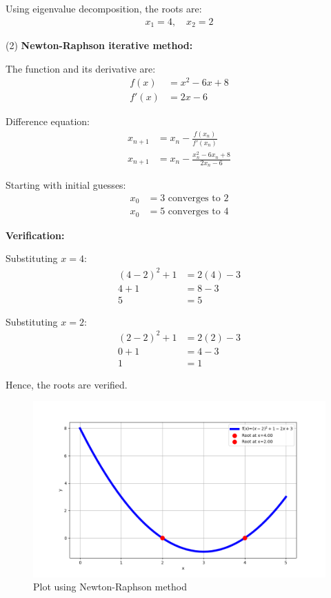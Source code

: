 \documentclass[journal]{IEEEtran}
\begin{document}
Using eigenvalue decomposition, the roots are:
\begin{align}
    x_1 = 4, \quad x_2 = 2
\end{align}

(2) \textbf{Newton-Raphson iterative method:}

The function and its derivative are:
\begin{align}
    f(x) &= x^2 - 6x + 8 \\
    f'(x) &= 2x - 6
\end{align}

Difference equation:
\begin{align}
    x_{n+1} &= x_n - \frac{f(x_n)}{f'(x_n)} \\
    x_{n+1} &= x_n - \frac{x_n^2 - 6x_n + 8}{2x_n - 6}
\end{align}

Starting with initial guesses:
\begin{align}
    x_0 &= 3 \text{ converges to } 2 \\
    x_0 &= 5 \text{ converges to } 4
\end{align}

\textbf{Verification:}

Substituting $x = 4$:
\begin{align}
    (4-2)^2 + 1 &= 2(4) - 3 \\
    4 + 1 &= 8 - 3 \\
    5 &= 5
\end{align}

Substituting $x = 2$:
\begin{align}
    (2-2)^2 + 1 &= 2(2) - 3 \\
    0 + 1 &= 4 - 3 \\
    1 &= 1
\end{align}

Hence, the roots are verified.

\begin{figure}[h]
\centering
\includegraphics[width=\columnwidth]{figs/fig.png}
\caption{Plot using Newton-Raphson method}
\label{fig:Plot1} 
\end{figure}
\end{document}
